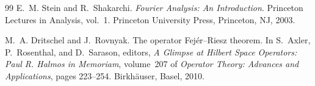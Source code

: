 \documentclass[11pt]{article}
\numberwithin{equation}{section}
\theoremstyle{remark}
\begin{document}
\begin{thebibliography}{99}
E.~M. Stein and R.~Shakarchi.
\newblock \emph{Fourier Analysis: An Introduction}.
\newblock Princeton Lectures in Analysis, vol.~1. Princeton University Press,
Princeton, NJ, 2003.

M.~A. Dritschel and J.~Rovnyak.
\newblock The operator Fej\'er--Riesz theorem.
\newblock In S.~Axler, P.~Rosenthal, and D.~Sarason, editors,
\emph{A Glimpse at Hilbert Space Operators: Paul R. Halmos in Memoriam},
volume~207 of \emph{Operator Theory: Advances and Applications},
pages 223--254.
Birkh\"auser, Basel, 2010.

\end{thebibliography}
\end{document}
